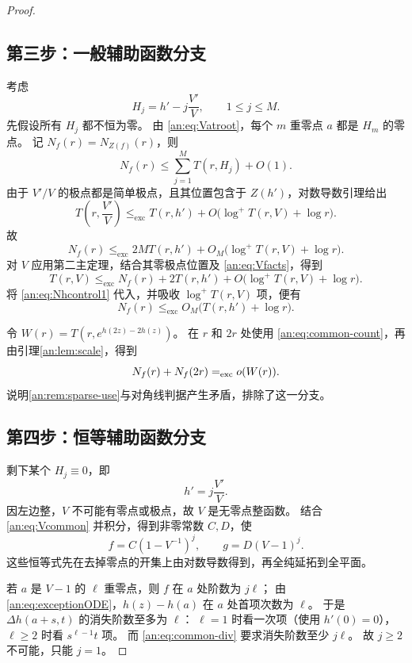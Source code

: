 \documentclass[11pt,a4paper,oneside,openany]{book}
\theoremstyle{lecture}
\newcommand{\excle}{\mathrel{\le_{\mathrm{exc}}}}
\numberwithin{equation}{section}
\begin{document}
\begin{proof}
\subsection*{第三步：一般辅助函数分支}
考虑
\[
 H_j=h'-j\frac{V'}V,\qquad 1\le j\le M.
\]
先假设所有 $H_j$ 都不恒为零。
由 \eqref{an:eq:Vatroot}，每个 $m$ 重零点 $a$ 都是 $H_m$ 的零点。
记 $N_f(r)=N_{Z(f)}(r)$，则
\begin{equation}\label{an:eq:Hjcount}
 N_f(r)\le\sum_{j=1}^M T(r,H_j)+O(1).
\end{equation}
由于 $V'/V$ 的极点都是简单极点，且其位置包含于 $Z(h')$，对数导数引理给出
\[
 T\left(r,\frac{V'}V\right)\excle
 T(r,h')+O\bigl(\log^+T(r,V)+\log r\bigr).
\]
故
\begin{equation}\label{an:eq:Nhcontrol1}
 N_f(r)\excle 2M T(r,h')+
 O_M\bigl(\log^+T(r,V)+\log r\bigr).
\end{equation}
对 $V$ 应用第二主定理，结合其零极点位置及 \eqref{an:eq:Vfacts}，得到
\[
 T(r,V)\excle N_f(r)+2T(r,h')+
 O\bigl(\log^+T(r,V)+\log r\bigr).
\]
将 \eqref{an:eq:Nhcontrol1} 代入，并吸收 $\log^+T(r,V)$ 项，便有
\begin{equation}\label{an:eq:common-count}
 N_f(r)\excle O_M\bigl(T(r,h')+\log r\bigr).
\end{equation}

令 $W(r)=T(r,e^{h(2z)-2h(z)})$。
在 $r$ 和 $2r$ 处使用 \eqref{an:eq:common-count}，再由引理\ref{an:lem:scale}，得到
\[
 N_f(r)+N_f(2r)=_{\rm exc}o(W(r)).
\]
说明\ref{an:rem:sparse-use}与对角线判据产生矛盾，排除了这一分支。

\subsection*{第四步：恒等辅助函数分支}
剩下某个 $H_j\equiv0$，即
\begin{equation}\label{an:eq:exceptionODE}
 h'=j\frac{V'}V.
\end{equation}
因左边整，$V$ 不可能有零点或极点，故 $V$ 是无零点整函数。
结合 \eqref{an:eq:Vcommon} 并积分，得到非零常数 $C,D$，使
\begin{equation}\label{an:eq:exceptionform}
 f=C(1-V^{-1})^j,\qquad g=D(V-1)^j.
\end{equation}
这些恒等式先在去掉零点的开集上由对数导数得到，再全纯延拓到全平面。

若 $a$ 是 $V-1$ 的 $\ell$ 重零点，则 $f$ 在 $a$ 处阶数为 $j\ell$；
由 \eqref{an:eq:exceptionODE}，$h(z)-h(a)$ 在 $a$ 处首项次数为 $\ell$。
于是 $\Delta h(a+s,t)$ 的消失阶数至多为 $\ell$：
$\ell=1$ 时看一次项（使用 $h'(0)=0$），$\ell\ge2$ 时看 $s^{\ell-1}t$ 项。
而 \eqref{an:eq:common-div} 要求消失阶数至少 $j\ell$。
故 $j\ge2$ 不可能，只能 $j=1$。


\end{proof}
\end{document}
